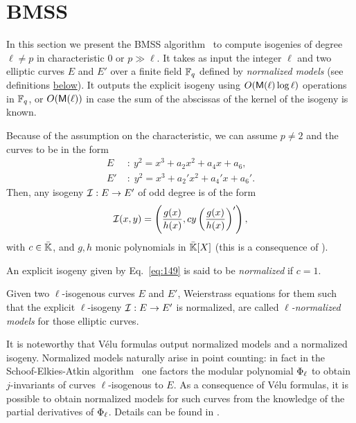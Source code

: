 \section{BMSS}
\label{sec:bmss}
In this section we present the BMSS
algorithm~\cite{bostan+morain+salvy+schost08} to compute isogenies of
degree $\ell\ne p$ in characteristic $0$ or $p\gg\ell$. It takes as
input the integer $\ell$ and two elliptic curves $E$ and $E'$ over a
finite field $\mathbb{F}_q$ defined by \emph{normalized models} (see
definitions \hyperref[def:canon-isog]{below}). It outputs the explicit
isogeny using $O(\mathsf{M}(\ell)\log\ell)$ operations in $\mathbb{F}_q$, or
$O(\mathsf{M}(\ell))$ in case the sum of the abscissas of the kernel of the
isogeny is known.

  Because of the assumption on
the characteristic, we can assume $p\ne 2$ and the curves to be in
the form
\begin{equation}
  \label{eq:140}
  \begin{aligned}
    E \;&:\: y^2 = x^3 + a_2x^2 + a_4x + a_6\text{,}\\
    E'\;&:\; y^2 = x^3 + a_2'x^2 + a_4'x + a_6'\text{.}
  \end{aligned}
\end{equation}
Then, any isogeny $\mathcal{I}:E\rightarrow E'$ of odd degree is of the form
\begin{equation}
  \label{eq:149}
  \mathcal{I}(x,y) = \left(\frac{g(x)}{h(x)},cy\left(\frac{g(x)}{h(x)}\right)'\right)
  \text{,}
\end{equation}
with $c\in\bar{\mathbb{K}}$, and $g,h$ monic polynomials in $\bar{\mathbb{K}}[X]$
(this is a consequence of ).

\begin{definition}
  \label{def:canon-isog}
  An explicit isogeny given by Eq.~\eqref{eq:149} is said to be
  \emph{normalized}
  if $c=1$. 

  Given two $\ell$-isogenous curves $E$ and $E'$, Weierstrass
  equations for them such that the explicit $\ell$-isogeny
  $\mathcal{I}:E\rightarrow E'$ is normalized, are called
  \emph{$\ell$-normalized models} for those
  elliptic curves.
\end{definition}

 It is noteworthy that Vélu formulas output normalized
models and a normalized isogeny. Normalized models naturally arise in
point counting: in fact in the Schoof-Elkies-Atkin
algorithm~\cite{atkin88,elkies98,schoof95} one factors the modular
polynomial $\Phi_\ell$ to obtain $j$-invariants of curves
$\ell$-isogenous to $E$. As a consequence of Vélu formulas, it is
possible to obtain normalized models for such curves from the
knowledge of the partial derivatives of $\Phi_\ell$.  Details can
be found in \cite{schoof95,morain95,elkies98,lercier-algorithmique}.

